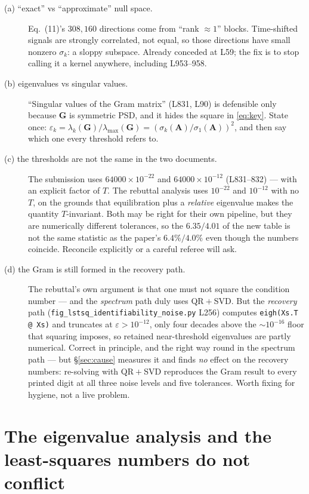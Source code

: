 \documentclass[11pt]{article}
\newcommand{\Mat}[1]{\mathbf{#1}}
\newcommand{\A}{\Mat{A}}
\newcommand{\eps}{\varepsilon}
\begin{document}
\begin{description}
\item[(a) ``exact'' vs ``approximate'' null space.] Eq.~(11)'s $308{,}160$
directions come from ``rank $\approx 1$'' blocks. Time-shifted signals are
strongly correlated, not equal, so those directions have small nonzero
$\sigma_k$: a sloppy subspace. Already conceded at L59; the fix is to stop
calling it a kernel anywhere, including L953--958.

\item[(b) eigenvalues vs singular values.] ``Singular values of the Gram
matrix'' (L831, L90) is defensible only because $\Mat G$ is symmetric PSD, and it
hides the square in \eqref{eq:key}. State once: $\eps_k =
\lambda_k(\Mat G)/\lambda_{\max}(\Mat G) = (\sigma_k(\A)/\sigma_1(\A))^2$, and
then say which one every threshold refers to.

\item[(c) the thresholds are not the same in the two documents.] The submission
uses $64000\times10^{-22}$ and $64000\times10^{-12}$ (L831--832) --- with an
explicit factor of $T$. The rebuttal analysis uses $10^{-22}$ and $10^{-12}$
with no $T$, on the grounds that equilibration plus a \emph{relative} eigenvalue
makes the quantity $T$-invariant. Both may be right for their own pipeline, but
they are numerically different tolerances, so the $6.35/4.01$ of the new table
is not the same statistic as the paper's $6.4\%/4.0\%$ even though the numbers
coincide. Reconcile explicitly or a careful referee will ask.

\item[(d) the Gram is still formed in the recovery path.] The rebuttal's own
argument is that one must not square the condition number --- and the
\emph{spectrum} path duly uses QR${}+{}$SVD. But the \emph{recovery} path
(\texttt{fig\_lstsq\_identifiability\_noise.py} L256) computes
\texttt{eigh(Xs.T @ Xs)} and truncates at $\eps>10^{-12}$, only four decades
above the $\sim10^{-16}$ floor that squaring imposes, so retained
near-threshold eigenvalues are partly numerical. Correct in principle, and the
right way round in the spectrum path --- but §\ref{sec:cause} measures it and
finds \emph{no} effect on the recovery numbers: re-solving with QR${}+{}$SVD
reproduces the Gram result to every printed digit at all three noise levels and
five tolerances. Worth fixing for hygiene, not a live problem.
\end{description}

\part{The eigenvalue analysis and the least-squares numbers do not conflict}
\end{document}
